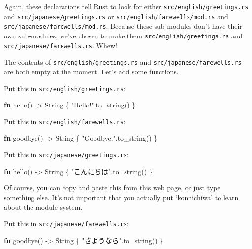 \documentclass[a4paper,]{book}
\newenvironment{Shaded}{\begin{snugshade}}{\end{snugshade}}
\newcommand{\KeywordTok}[1]{\textcolor[rgb]{0.13,0.29,0.53}{\textbf{{#1}}}}
\newcommand{\DataTypeTok}[1]{\textcolor[rgb]{0.13,0.29,0.53}{{#1}}}
\newcommand{\StringTok}[1]{\textcolor[rgb]{0.31,0.60,0.02}{{#1}}}
\newcommand{\NormalTok}[1]{{#1}}
\begin{document}
Again, these declarations tell Rust to look for either
\texttt{src/english/greetings.rs} and \texttt{src/japanese/greetings.rs}
or \texttt{src/english/farewells/mod.rs} and
\texttt{src/japanese/farewells/mod.rs}. Because these sub-modules don't
have their own sub-modules, we've chosen to make them
\texttt{src/english/greetings.rs} and
\texttt{src/japanese/farewells.rs}. Whew!

The contents of \texttt{src/english/greetings.rs} and
\texttt{src/japanese/farewells.rs} are both empty at the moment. Let's
add some functions.

Put this in \texttt{src/english/greetings.rs}:

\begin{Shaded}
\begin{Highlighting}[]
\KeywordTok{fn} \NormalTok{hello() -> }\DataTypeTok{String} \NormalTok{\{}
    \StringTok{"Hello!"}\NormalTok{.to_string()}
\NormalTok{\}}
\end{Highlighting}
\end{Shaded}

Put this in \texttt{src/english/farewells.rs}:

\begin{Shaded}
\begin{Highlighting}[]
\KeywordTok{fn} \NormalTok{goodbye() -> }\DataTypeTok{String} \NormalTok{\{}
    \StringTok{"Goodbye."}\NormalTok{.to_string()}
\NormalTok{\}}
\end{Highlighting}
\end{Shaded}

Put this in \texttt{src/japanese/greetings.rs}:

\begin{Shaded}
\begin{Highlighting}[]
\KeywordTok{fn} \NormalTok{hello() -> }\DataTypeTok{String} \NormalTok{\{}
    \StringTok{"こんにちは"}\NormalTok{.to_string()}
\NormalTok{\}}
\end{Highlighting}
\end{Shaded}

Of course, you can copy and paste this from this web page, or just type
something else. It's not important that you actually put `konnichiwa' to
learn about the module system.

Put this in \texttt{src/japanese/farewells.rs}:

\begin{Shaded}
\begin{Highlighting}[]
\KeywordTok{fn} \NormalTok{goodbye() -> }\DataTypeTok{String} \NormalTok{\{}
    \StringTok{"さようなら"}\NormalTok{.to_string()}
\NormalTok{\}}
\end{Highlighting}
\end{Shaded}
\end{document}
